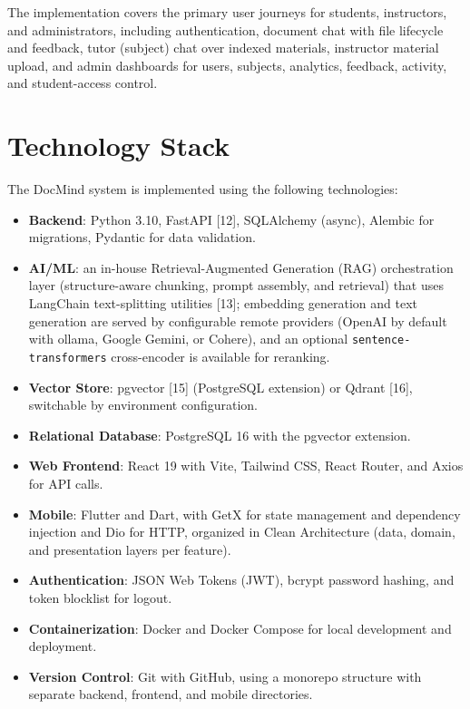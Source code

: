 \documentclass[12pt, a4paper, oneside]{report}
\let\oldsection\section
\renewcommand{\section}{%
  \addtocontents{toc}{\protect\needspace{4\baselineskip}}%
  \oldsection
}
\begin{document}
The implementation covers the primary user journeys for students, instructors, and administrators, including authentication, document chat with file lifecycle and feedback, tutor (subject) chat over indexed materials, instructor material upload, and admin dashboards for users, subjects, analytics, feedback, activity, and student-access control.

\section{Technology Stack}

The DocMind system is implemented using the following technologies:

\begin{itemize}
  \item \textbf{Backend}: Python 3.10, FastAPI [12], SQLAlchemy (async), Alembic for migrations, Pydantic for data validation.
  \item \textbf{AI/ML}: an in-house Retrieval-Augmented Generation (RAG) orchestration layer (structure-aware chunking, prompt assembly, and retrieval) that uses LangChain text-splitting utilities [13]; embedding generation and text generation are served by configurable remote providers (OpenAI by default with ollama, Google Gemini, or Cohere), and an optional \texttt{sentence-transformers} cross-encoder is available for reranking.
  \item \textbf{Vector Store}: pgvector [15] (PostgreSQL extension) or Qdrant [16], switchable by environment configuration.
  \item \textbf{Relational Database}: PostgreSQL 16 with the pgvector extension.
  \item \textbf{Web Frontend}: React 19 with Vite, Tailwind CSS, React Router, and Axios for API calls.
  \item \textbf{Mobile}: Flutter and Dart, with GetX for state management and dependency injection and Dio for HTTP, organized in Clean Architecture (data, domain, and presentation layers per feature).
  \item \textbf{Authentication}: JSON Web Tokens (JWT), bcrypt password hashing, and token blocklist for logout.
  \item \textbf{Containerization}: Docker and Docker Compose for local development and deployment.
  \item \textbf{Version Control}: Git with GitHub, using a monorepo structure with separate backend, frontend, and mobile directories.
\end{itemize}
\end{document}
